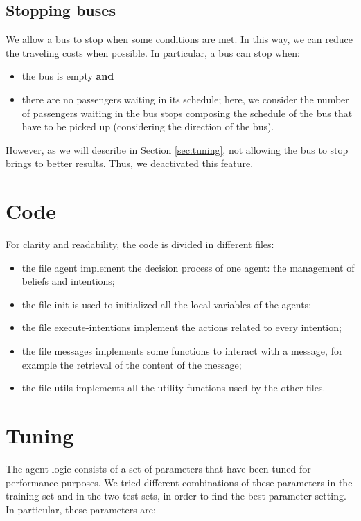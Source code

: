 \documentclass[a4paper]{article}
\begin{document}
\subsection{Stopping buses}
\label{sec:stop}
We allow a bus to stop when some conditions are met. In this way, we can reduce the traveling costs when possible. In particular, a bus can stop when:

\begin{itemize}
\item the bus is empty \textbf{and}
\item there are no passengers waiting in its schedule; here, we consider the number of passengers waiting in the bus stops composing the schedule of the bus that have to be picked up (considering the direction of the bus).
\end{itemize}

However, as we will describe in Section \ref{sec:tuning}, not allowing the bus to stop brings to better results. Thus, we deactivated this feature.

\section{Code}
For clarity and readability, the code is divided in different files:

\begin{itemize}
\item the file agent implement the decision process of one agent: the management of beliefs and intentions;
\item the file init is used to initialized all the local variables of the agents;
\item the file execute-intentions implement the actions related to every intention;
\item the file messages implements some functions to interact with a message, for example the retrieval of the content of the message;
\item the file utils implements all the utility functions used by the other files.
\end{itemize} 

\section{Tuning}
The agent logic consists of a set of parameters that have been tuned for performance purposes. We tried different combinations of these parameters in the training set and in the two test sets, in order to find the best parameter setting. In particular, these parameters are:
\end{document}
